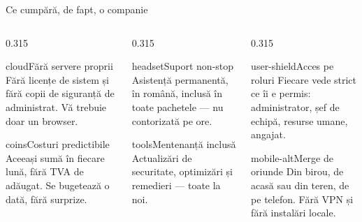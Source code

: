 \documentclass[aspectratio=169,11pt,t,xcolor={table}]{beamer}
\begin{document}
\begin{frame}{Ce cumpără, de fapt, o companie}
  \begin{columns}[T,onlytextwidth]
    \begin{column}{0.315\textwidth}
      \begin{card}[brandBlue]{cloud}{Fără servere proprii}
        \footnotesize Fără licențe de sistem și fără copii de siguranță de
        administrat. Vă trebuie doar un browser.
      \end{card}
      \vspace{5pt}
      \begin{card}[brandBlue]{coins}{Costuri predictibile}
        \footnotesize Aceeași sumă în fiecare lună, fără TVA de adăugat. Se bugetează o
        dată, fără surprize.
      \end{card}
    \end{column}
    \begin{column}{0.315\textwidth}
      \begin{card}[brandBlue]{headset}{Suport non-stop}
        \footnotesize Asistență permanentă, în română, inclusă în toate pachetele —
        nu contorizată pe ore.
      \end{card}
      \vspace{5pt}
      \begin{card}[brandBlue]{tools}{Mentenanță inclusă}
        \footnotesize Actualizări de securitate, optimizări și remedieri — toate la
        noi.
      \end{card}
    \end{column}
    \begin{column}{0.315\textwidth}
      \begin{card}[brandBlue]{user-shield}{Acces pe roluri}
        \footnotesize Fiecare vede strict ce îi e permis: administrator, șef de
        echipă, resurse umane, angajat.
      \end{card}
      \vspace{5pt}
      \begin{card}[brandBlue]{mobile-alt}{Merge de oriunde}
        \footnotesize Din birou, de acasă sau din teren, de pe telefon. Fără VPN și
        fără instalări locale.
      \end{card}
    \end{column}
  \end{columns}
\end{frame}
\end{document}
